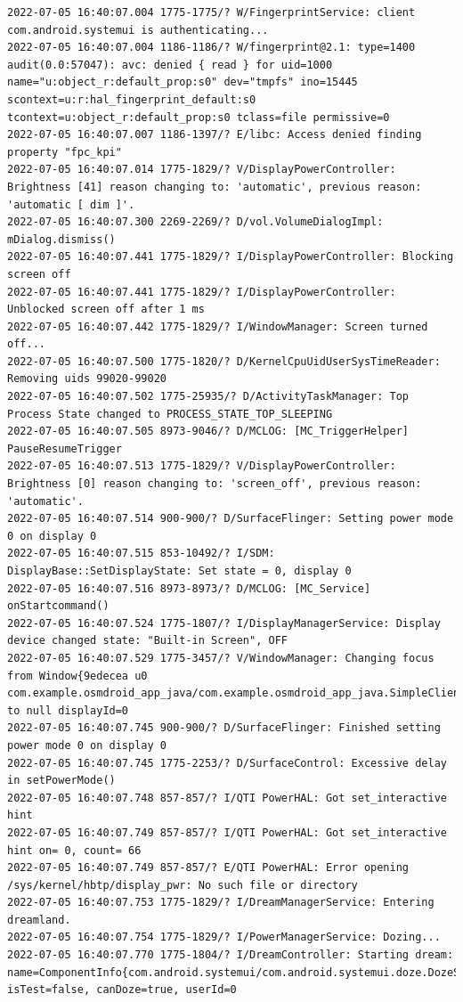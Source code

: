 \documentclass[a4paper,12pt]{book}
\begin{document}
\begin{lstlisting}
2022-07-05 16:40:07.004 1775-1775/? W/FingerprintService: client com.android.systemui is authenticating...
2022-07-05 16:40:07.004 1186-1186/? W/fingerprint@2.1: type=1400 audit(0.0:57047): avc: denied { read } for uid=1000 name="u:object_r:default_prop:s0" dev="tmpfs" ino=15445 scontext=u:r:hal_fingerprint_default:s0 tcontext=u:object_r:default_prop:s0 tclass=file permissive=0
2022-07-05 16:40:07.007 1186-1397/? E/libc: Access denied finding property "fpc_kpi"
2022-07-05 16:40:07.014 1775-1829/? V/DisplayPowerController: Brightness [41] reason changing to: 'automatic', previous reason: 'automatic [ dim ]'.
2022-07-05 16:40:07.300 2269-2269/? D/vol.VolumeDialogImpl: mDialog.dismiss()
2022-07-05 16:40:07.441 1775-1829/? I/DisplayPowerController: Blocking screen off
2022-07-05 16:40:07.441 1775-1829/? I/DisplayPowerController: Unblocked screen off after 1 ms
2022-07-05 16:40:07.442 1775-1829/? I/WindowManager: Screen turned off...
2022-07-05 16:40:07.500 1775-1820/? D/KernelCpuUidUserSysTimeReader: Removing uids 99020-99020
2022-07-05 16:40:07.502 1775-25935/? D/ActivityTaskManager: Top Process State changed to PROCESS_STATE_TOP_SLEEPING
2022-07-05 16:40:07.505 8973-9046/? D/MCLOG: [MC_TriggerHelper] PauseResumeTrigger
2022-07-05 16:40:07.513 1775-1829/? V/DisplayPowerController: Brightness [0] reason changing to: 'screen_off', previous reason: 'automatic'.
2022-07-05 16:40:07.514 900-900/? D/SurfaceFlinger: Setting power mode 0 on display 0
2022-07-05 16:40:07.515 853-10492/? I/SDM: DisplayBase::SetDisplayState: Set state = 0, display 0
2022-07-05 16:40:07.516 8973-8973/? D/MCLOG: [MC_Service] onStartcommand()
2022-07-05 16:40:07.524 1775-1807/? I/DisplayManagerService: Display device changed state: "Built-in Screen", OFF
2022-07-05 16:40:07.529 1775-3457/? V/WindowManager: Changing focus from Window{9edecea u0 com.example.osmdroid_app_java/com.example.osmdroid_app_java.SimpleClient} to null displayId=0
2022-07-05 16:40:07.745 900-900/? D/SurfaceFlinger: Finished setting power mode 0 on display 0
2022-07-05 16:40:07.745 1775-2253/? D/SurfaceControl: Excessive delay in setPowerMode()
2022-07-05 16:40:07.748 857-857/? I/QTI PowerHAL: Got set_interactive hint
2022-07-05 16:40:07.749 857-857/? I/QTI PowerHAL: Got set_interactive hint on= 0, count= 66
2022-07-05 16:40:07.749 857-857/? E/QTI PowerHAL: Error opening /sys/kernel/hbtp/display_pwr: No such file or directory
2022-07-05 16:40:07.753 1775-1829/? I/DreamManagerService: Entering dreamland.
2022-07-05 16:40:07.754 1775-1829/? I/PowerManagerService: Dozing...
2022-07-05 16:40:07.770 1775-1804/? I/DreamController: Starting dream: name=ComponentInfo{com.android.systemui/com.android.systemui.doze.DozeService}, isTest=false, canDoze=true, userId=0

\end{lstlisting}
\end{document}
